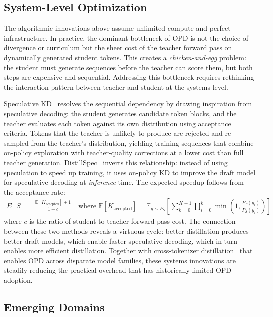 \documentclass{article} %
\begin{document}
\subsection{System-Level Optimization}
\label{subsec:systems}

The algorithmic innovations above assume unlimited compute and perfect infrastructure. In practice, the dominant bottleneck of OPD is not the choice of divergence or curriculum but the sheer cost of the teacher forward pass on dynamically generated student tokens. This creates a \emph{chicken-and-egg} problem: the student must generate sequences before the teacher can score them, but both steps are expensive and sequential. Addressing this bottleneck requires rethinking the interaction pattern between teacher and student at the systems level.

Speculative KD~\citep{2410.11325} resolves the sequential dependency by drawing inspiration from speculative decoding: the student generates candidate token blocks, and the teacher evaluates each token against its own distribution using acceptance criteria. Tokens that the teacher is unlikely to produce are rejected and re-sampled from the teacher's distribution, yielding training sequences that combine on-policy exploration with teacher-quality corrections at a lower cost than full teacher generation. DistillSpec~\citep{2310.08461} inverts this relationship: instead of using speculation to speed up training, it uses on-policy KD to improve the draft model for speculative decoding at \emph{inference} time. The expected speedup follows from the acceptance rate:
\begin{align}
E[S] = \frac{\mathbb{E}[K_{\text{accepted}}] + 1}{1 + c} \quad \text{where } \mathbb{E}[K_{\text{accepted}}] = \mathbb{E}_{y \sim P_S}\!\left[\sum_{k=0}^{K-1} \prod_{i=0}^{k} \min\!\left(1, \frac{P_T(y_i)}{P_S(y_i)}\right)\right]
\end{align}
where $c$ is the ratio of student-to-teacher forward-pass cost. The connection between these two methods reveals a virtuous cycle: better distillation produces better draft models, which enable faster speculative decoding, which in turn enables more efficient distillation. Together with cross-tokenizer distillation~\citep{2402.12030} that enables OPD across disparate model families, these systems innovations are steadily reducing the practical overhead that has historically limited OPD adoption.

\subsection{Emerging Domains}
\label{subsec:emerging}
\end{document}

